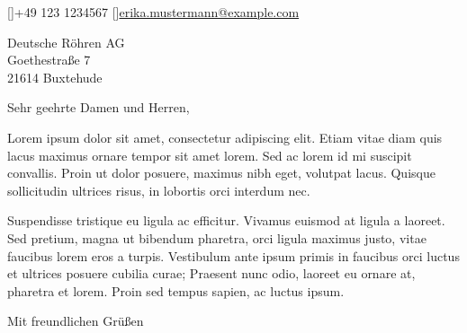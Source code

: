 \documentclass[
fromphone=true,
fromemail=true
]{scrlttr2}
\begin{document}
	[]{+49 123 1234567}
	[]{\href{mailto:erika.mustermann@example.com}{erika.mustermann@example.com}}
	
	
	
	
	\begin{letter}{
			Deutsche Röhren AG\\
			Goethestraße 7\\
			21614 Buxtehude
		}
		
		\opening{Sehr geehrte Damen und Herren,}
		
		Lorem ipsum dolor sit amet, consectetur adipiscing elit. Etiam vitae diam quis lacus maximus ornare tempor sit amet lorem. Sed ac lorem id mi suscipit convallis. Proin ut dolor posuere, maximus nibh eget, volutpat lacus. Quisque sollicitudin ultrices risus, in lobortis orci interdum nec.
		
		Suspendisse tristique eu ligula ac efficitur. Vivamus euismod at ligula a laoreet. Sed pretium, magna ut bibendum pharetra, orci ligula maximus justo, vitae faucibus lorem eros a turpis. Vestibulum ante ipsum primis in faucibus orci luctus et ultrices posuere cubilia curae; Praesent nunc odio, laoreet eu ornare at, pharetra et lorem. Proin sed tempus sapien, ac luctus ipsum.
		
		\closing{Mit freundlichen Grüßen}
		
	\end{letter}
\end{document}
